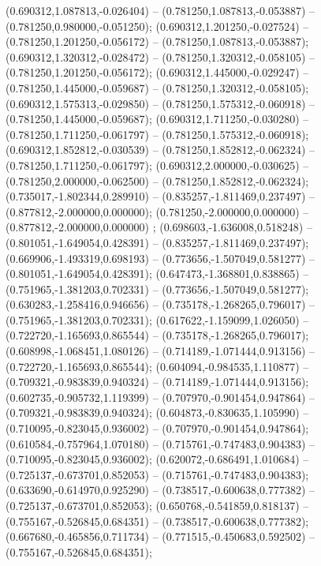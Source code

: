  (0.690312,1.087813,-0.026404) -- (0.781250,1.087813,-0.053887) -- (0.781250,0.980000,-0.051250);
 (0.690312,1.201250,-0.027524) -- (0.781250,1.201250,-0.056172) -- (0.781250,1.087813,-0.053887);
 (0.690312,1.320312,-0.028472) -- (0.781250,1.320312,-0.058105) -- (0.781250,1.201250,-0.056172);
 (0.690312,1.445000,-0.029247) -- (0.781250,1.445000,-0.059687) -- (0.781250,1.320312,-0.058105);
 (0.690312,1.575313,-0.029850) -- (0.781250,1.575312,-0.060918) -- (0.781250,1.445000,-0.059687);
 (0.690312,1.711250,-0.030280) -- (0.781250,1.711250,-0.061797) -- (0.781250,1.575312,-0.060918);
 (0.690312,1.852812,-0.030539) -- (0.781250,1.852812,-0.062324) -- (0.781250,1.711250,-0.061797);
 (0.690312,2.000000,-0.030625) -- (0.781250,2.000000,-0.062500) -- (0.781250,1.852812,-0.062324);
 (0.735017,-1.802344,0.289910) -- (0.835257,-1.811469,0.237497) -- (0.877812,-2.000000,0.000000);
 (0.781250,-2.000000,0.000000) -- (0.877812,-2.000000,0.000000) ;
 (0.698603,-1.636008,0.518248) -- (0.801051,-1.649054,0.428391) -- (0.835257,-1.811469,0.237497);
 (0.669906,-1.493319,0.698193) -- (0.773656,-1.507049,0.581277) -- (0.801051,-1.649054,0.428391);
 (0.647473,-1.368801,0.838865) -- (0.751965,-1.381203,0.702331) -- (0.773656,-1.507049,0.581277);
 (0.630283,-1.258416,0.946656) -- (0.735178,-1.268265,0.796017) -- (0.751965,-1.381203,0.702331);
 (0.617622,-1.159099,1.026050) -- (0.722720,-1.165693,0.865544) -- (0.735178,-1.268265,0.796017);
 (0.608998,-1.068451,1.080126) -- (0.714189,-1.071444,0.913156) -- (0.722720,-1.165693,0.865544);
 (0.604094,-0.984535,1.110877) -- (0.709321,-0.983839,0.940324) -- (0.714189,-1.071444,0.913156);
 (0.602735,-0.905732,1.119399) -- (0.707970,-0.901454,0.947864) -- (0.709321,-0.983839,0.940324);
 (0.604873,-0.830635,1.105990) -- (0.710095,-0.823045,0.936002) -- (0.707970,-0.901454,0.947864);
 (0.610584,-0.757964,1.070180) -- (0.715761,-0.747483,0.904383) -- (0.710095,-0.823045,0.936002);
 (0.620072,-0.686491,1.010684) -- (0.725137,-0.673701,0.852053) -- (0.715761,-0.747483,0.904383);
 (0.633690,-0.614970,0.925290) -- (0.738517,-0.600638,0.777382) -- (0.725137,-0.673701,0.852053);
 (0.650768,-0.541859,0.818137) -- (0.755167,-0.526845,0.684351) -- (0.738517,-0.600638,0.777382);
 (0.667680,-0.465856,0.711734) -- (0.771515,-0.450683,0.592502) -- (0.755167,-0.526845,0.684351);
